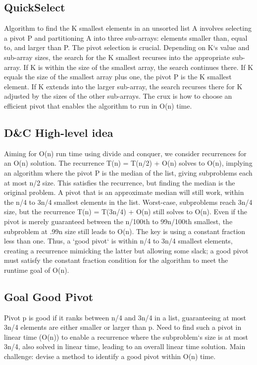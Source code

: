 \subsection*{QuickSelect}
Algorithm to find the K smallest elements in an unsorted list A involves selecting a pivot P and partitioning A into three sub-arrays: elements smaller than, equal to, and larger than P\@.
The pivot selection is crucial.
Depending on K`s value and sub-array sizes, the search for the K smallest recurses into the appropriate sub-array.
If K is within the size of the smallest array, the search continues there.
If K equals the size of the smallest array plus one, the pivot P is the K smallest element.
If K extends into the larger sub-array, the search recurses there for K adjusted by the sizes of the other sub-arrays.
The crux is how to choose an efficient pivot that enables the algorithm to run in O(n) time.

\subsection*{D\&C  High-level idea}
Aiming for O(n) run time using divide and conquer, we consider recurrences for an O(n) solution.
The recurrence T(n) = T(n/2) + O(n) solves to O(n), implying an algorithm where the pivot P is the median of the list, giving subproblems each at most n/2 size.
This satisfies the recurrence, but finding the median is the original problem.
A pivot that is an approximate median will still work, within the n/4 to 3n/4 smallest elements in the list.
Worst-case, subproblems reach 3n/4 size, but the recurrence T(n) = T(3n/4) + O(n) still solves to O(n).
Even if the pivot is merely guaranteed between the n/100th to 99n/100th smallest, the subproblem at .99n size still leads to O(n).
The key is using a constant fraction less than one.
Thus, a `good pivot` is within n/4 to 3n/4 smallest elements, creating a recurrence mimicking the latter but allowing some slack; a good pivot must satisfy the constant fraction condition for the algorithm to meet the runtime goal of O(n).

\subsection*{Goal  Good Pivot}
Pivot p is good if it ranks between n/4 and 3n/4 in a list, guaranteeing at most 3n/4 elements are either smaller or larger than p.
Need to find such a pivot in linear time (O(n)) to enable a recurrence where the subproblem`s size is at most 3n/4, also solved in linear time, leading to an overall linear time solution.
Main challenge: devise a method to identify a good pivot within O(n) time.


